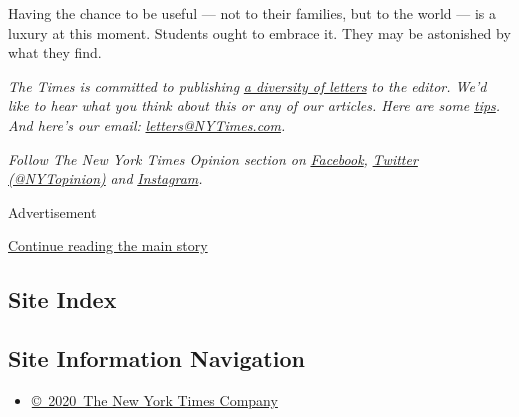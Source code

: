 Having the chance to be useful --- not to their families, but to the
world --- is a luxury at this moment. Students ought to embrace it. They
may be astonished by what they find.

\emph{The Times is committed to publishing}
\href{https://www.nytimes3xbfgragh.onion/2019/01/31/opinion/letters/letters-to-editor-new-york-times-women.html}{\emph{a
diversity of letters}} \emph{to the editor. We'd like to hear what you
think about this or any of our articles. Here are some}
\href{https://help.nytimes3xbfgragh.onion/hc/en-us/articles/115014925288-How-to-submit-a-letter-to-the-editor}{\emph{tips}}\emph{.
And here's our email:}
\href{mailto:letters@NYTimes.com}{\emph{letters@NYTimes.com}}\emph{.}

\emph{Follow The New York Times Opinion section on}
\href{https://www.facebookcorewwwi.onion/nytopinion}{\emph{Facebook}}\emph{,}
\href{http://twitter.com/NYTOpinion}{\emph{Twitter (@NYTopinion)}}
\emph{and}
\href{https://www.instagram.com/nytopinion/}{\emph{Instagram}}\emph{.}

Advertisement

\protect\hyperlink{after-bottom}{Continue reading the main story}

\hypertarget{site-index}{%
\subsection{Site Index}\label{site-index}}

\hypertarget{site-information-navigation}{%
\subsection{Site Information
Navigation}\label{site-information-navigation}}

\begin{itemize}
\tightlist
\item
  \href{https://help.nytimes3xbfgragh.onion/hc/en-us/articles/115014792127-Copyright-notice}{©~2020~The
  New York Times Company}
\end{itemize}

